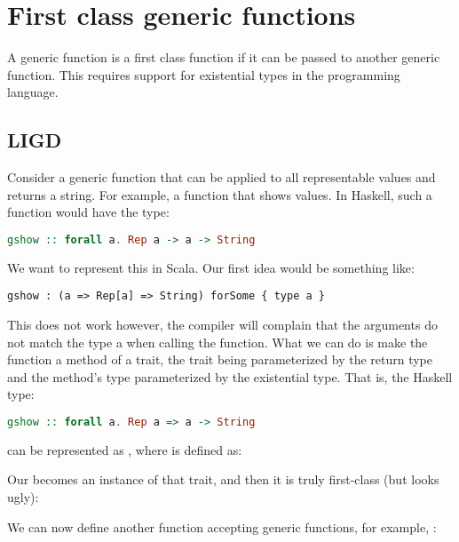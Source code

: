 \section{First class generic functions}

A generic function is a first class function if it can be passed to another
generic function. This requires support for existential types in the programming
language.

\subsection{LIGD}

Consider a generic function that can be applied to all representable values
and returns a string. For example, a function  that shows values.
In Haskell, such a function would have the type:
\begin{lstlisting}[language=Haskell]
gshow :: forall a. Rep a -> a -> String
\end{lstlisting}

We want to represent this in Scala. Our first idea would be something like:
\begin{lstlisting}
gshow : (a => Rep[a] => String) forSome { type a }
\end{lstlisting}
This does not work however, the compiler will complain that the arguments do
not match the type a when calling the function. What we can do is make the
function a method of a trait, the trait being parameterized by the return
type and the method's type parameterized by the existential type. That is, the
Haskell type:
\begin{lstlisting}[language=Haskell]
gshow :: forall a. Rep a => a -> String
\end{lstlisting}
can be represented as , where  is defined
as:

Our  becomes an instance of that trait, and then it is truly first-class (but looks ugly):

We can now define another function accepting generic functions, for example,
:

